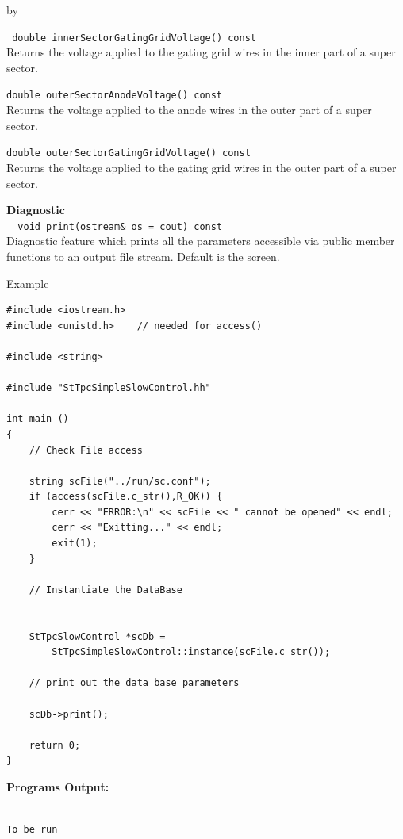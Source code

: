 \documentclass[twoside]{article}
\newcommand{\entrylabel}[1]{\mbox{\textbf{{#1}}}\hfil}%
\newenvironment{entry}
{\begin{list}{}%
    {\renewcommand{\makelabel}{\entrylabel}%
     \setlength{\labelwidth}{90pt}%
     \setlength{\leftmargin}{\labelwidth}
     \advance\leftmargin by \labelsep%
      }%
    }%
  {\end{list}}
\newcommand{\Entrylabel}[1]%
{\raisebox{0pt}[1ex][0pt]{\makebox[\labelwidth][l]%
    {\parbox[t]{\labelwidth}{\hspace{0pt}\textbf{{#1}}}}}}
\newenvironment{Entry}%
{\renewcommand{\entrylabel}{\Entrylabel}\begin{entry}}%
  {\end{entry}}
\begin{document}
\begin{Entry}
  \verb+ double innerSectorGatingGridVoltage() const+\\
  Returns the voltage applied to the gating grid wires
  in the inner part of a super sector.

  \verb+double outerSectorAnodeVoltage() const+\\
  Returns the voltage applied to the anode wires in the
  outer part of a super sector.

  \verb+double outerSectorGatingGridVoltage() const+\\
  Returns the voltage applied to the gating grid wires
  in the outer part of a super sector.

  {\bf Diagnostic \\}
  \verb+  void print(ostream& os = cout) const+\\
  Diagnostic feature which prints all the parameters accessible
  via public member functions to an output file stream.  Default
  is the screen.

\item[Example]

{\footnotesize
\begin{verbatim}
#include <iostream.h>
#include <unistd.h>    // needed for access()

#include <string>

#include "StTpcSimpleSlowControl.hh"

int main ()
{
    // Check File access

    string scFile("../run/sc.conf");
    if (access(scFile.c_str(),R_OK)) {
        cerr << "ERROR:\n" << scFile << " cannot be opened" << endl;
        cerr << "Exitting..." << endl;
        exit(1);
    }

    // Instantiate the DataBase

    
    StTpcSlowControl *scDb =
        StTpcSimpleSlowControl::instance(scFile.c_str());

    // print out the data base parameters

    scDb->print();
    
    return 0;
}
\end{verbatim}
}%
{\bf Programs Output:}
{\footnotesize
\begin{verbatim}

To be run

\end{verbatim}
} %

\end{Entry}
\clearpage
\end{document}
